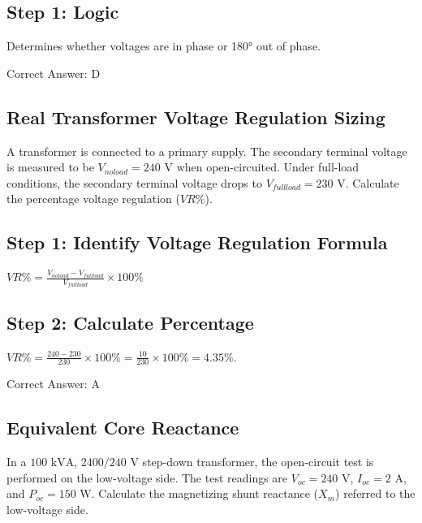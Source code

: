 \begin{solution}

\subsection*{Step 1: Logic}
Determines whether voltages are in phase or 180° out of phase.

Correct Answer: D
\end{solution}

\clearpage

\subsection{Real Transformer Voltage Regulation Sizing}

A transformer is connected to a primary supply. The secondary terminal voltage is measured to be $V_{noload} = 240\text{ V}$ when open-circuited. Under full-load conditions, the secondary terminal voltage drops to $V_{fullload} = 230\text{ V}$. Calculate the percentage voltage regulation ($VR\%$).

\begin{choices}
\end{choices}

\begin{solution}

\subsection*{Step 1: Identify Voltage Regulation Formula}
$VR\% = \frac{V_{noload} - V_{fullload}}{V_{fullload}} \times 100\%$

\subsection*{Step 2: Calculate Percentage}
$VR\% = \frac{240 - 230}{230} \times 100\% = \frac{10}{230} \times 100\% = 4.35\%$.

Correct Answer: A
\end{solution}

\clearpage

\subsection{Equivalent Core Reactance}

In a $100\text{ kVA}$, $2400/240\text{ V}$ step-down transformer, the open-circuit test is performed on the low-voltage side. The test readings are $V_{oc} = 240\text{ V}$, $I_{oc} = 2\text{ A}$, and $P_{oc} = 150\text{ W}$. Calculate the magnetizing shunt reactance ($X_m$) referred to the low-voltage side.

